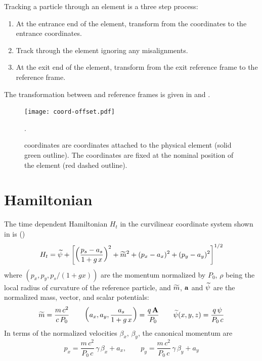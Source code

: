 Tracking a particle through an element is a three step process:
\begin{enumerate}
\item
At the entrance end of the element, transform from the  coordinates to the entrance
 coordinates.
\item
Track through the element ignoring any misalignments. 
\item
At the exit end of the element, transform from the exit  reference frame to the
 reference frame.
\end{enumerate}

The transformation between  and  reference frames is given in
 and .


\begin{figure}[tb]
  \centering
  \texttt{[image: coord-offset.pdf]}
  \caption[Element Coordinate System.]
  {
 coordinates are coordinates attached to the physical element (solid green outline). The
 coordinates are fixed at the nominal position of the element (red dashed outline).
  }
  \label{f:ele.coord}.
\end{figure}

\section{Hamiltonian}
\label{s:mag.hamiltonian}
The time dependent Hamiltonian $H_t$ in the curvilinear coordinate system shown
in  is (\cite{b:ruth})
\begin{equation}
  H_t = \widetilde\psi + \left[ \left( \frac{p_s - a_s}{1 + g\, x} \right)^2 + \widetilde m^2 + 
  (p_x - a_x)^2 + (p_y - a_y)^2 \right]^{1/2}
\end{equation}
where $(p_x, p_y, p_s/(1+gx))$ are the momentum normalized by $P_0$, $\rho$ being the local radius
of curvature of the reference particle, and $\widetilde m$, ${\bf a}$ and $\widetilde\psi$ are the normalized mass,
vector, and scalar potentials:
\begin{equation}
  \widetilde m = \frac{m \, c^2}{c \, P_0} \qquad
  \left( a_x, a_y, \frac{a_s}{1+g \, x} \right) = \frac{q \, {\bf A}}{P_0} \qquad 
  \widetilde\psi(x,y,z) = \frac{q \, \psi}{P_0 \, c}
  \label{mmccp}
\end{equation}
In terms of the normalized velocities $\beta_x$, $\beta_y$, the canonical momentum are
\begin{equation}
  p_x = \frac{m \, c^2}{P_0 \, c} \, \gamma \, \beta_x + a_x, \qquad 
  p_y = \frac{m \, c^2}{P_0 \, c} \, \gamma \, \beta_y + a_y
  \label{pmc2pc}
\end{equation}

